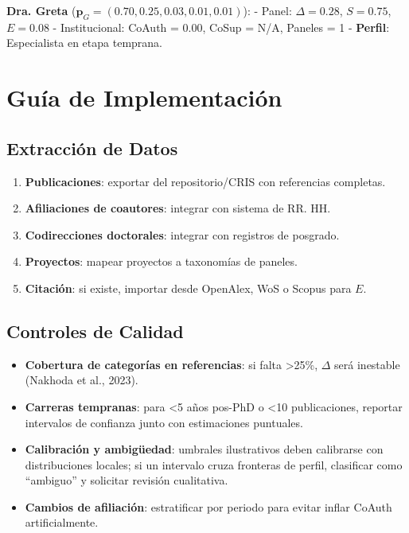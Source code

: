 \documentclass[
]{article}
\providecommand{\tightlist}{%
  \setlength{\itemsep}{0pt}\setlength{\parskip}{0pt}}
\begin{document}
\textbf{Dra. Greta} (\(\mathbf{p}_G = (0.70, 0.25, 0.03, 0.01, 0.01)\)):
- Panel: \(\Delta = 0.28\), \(S = 0.75\), \(E = 0.08\) - Institucional:
CoAuth = 0.00, CoSup = N/A, Paneles = 1 - \textbf{Perfil}: Especialista
en etapa temprana.

\hypertarget{guuxeda-de-implementaciuxf3n}{%
\section{Guía de Implementación}\label{guuxeda-de-implementaciuxf3n}}

\hypertarget{extracciuxf3n-de-datos}{%
\subsection{Extracción de Datos}\label{extracciuxf3n-de-datos}}

\begin{enumerate}
\def\labelenumi{\arabic{enumi}.}
\tightlist
\item
  \textbf{Publicaciones}: exportar del repositorio/CRIS con referencias
  completas.
\item
  \textbf{Afiliaciones de coautores}: integrar con sistema de RR. HH.
\item
  \textbf{Codirecciones doctorales}: integrar con registros de posgrado.
\item
  \textbf{Proyectos}: mapear proyectos a taxonomías de paneles.
\item
  \textbf{Citación}: si existe, importar desde OpenAlex, WoS o Scopus
  para \(E\).
\end{enumerate}

\hypertarget{controles-de-calidad}{%
\subsection{Controles de Calidad}\label{controles-de-calidad}}

\begin{itemize}
\tightlist
\item
  \textbf{Cobertura de categorías en referencias}: si falta
  \textgreater25\%, \(\Delta\) será inestable (Nakhoda et al., 2023).
\item
  \textbf{Carreras tempranas}: para \textless5 años pos-PhD o
  \textless10 publicaciones, reportar intervalos de confianza junto con
  estimaciones puntuales.
\item
  \textbf{Calibración y ambigüedad}: umbrales ilustrativos deben
  calibrarse con distribuciones locales; si un intervalo cruza fronteras
  de perfil, clasificar como ``ambiguo'' y solicitar revisión
  cualitativa.
\item
  \textbf{Cambios de afiliación}: estratificar por periodo para evitar
  inflar CoAuth artificialmente.
\end{itemize}
\end{document}
